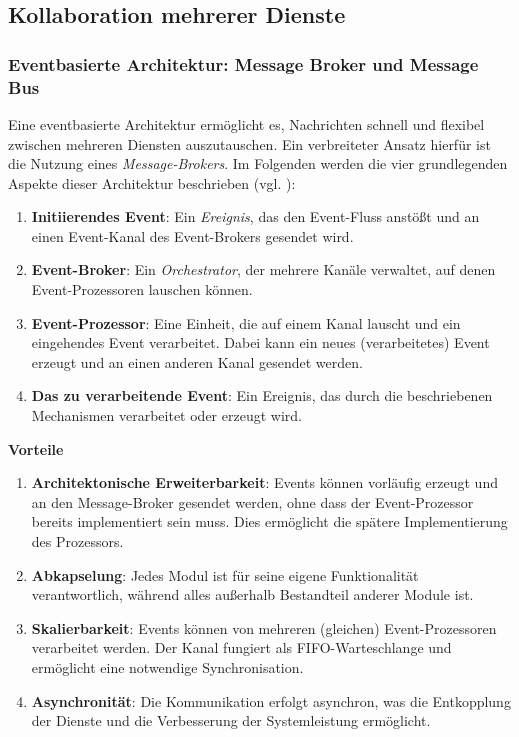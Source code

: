 \subsection{Kollaboration mehrerer Dienste}

\subsubsection{Eventbasierte Architektur: Message Broker und Message Bus} \label{cha:grundlagen:swdesign:kollab:msgbus}

Eine eventbasierte Architektur ermöglicht es, Nachrichten schnell und flexibel zwischen mehreren Diensten auszutauschen. Ein verbreiteter Ansatz hierfür ist die Nutzung eines \textit{Message-Brokers}. Im Folgenden werden die vier grundlegenden Aspekte dieser Architektur beschrieben (vgl. \autocite{oreilly:mod-swarch}):
\begin{enumerate}
    \item \textbf{Initiierendes Event}: Ein \textit{Ereignis}, das den Event-Fluss anstößt und an einen Event-Kanal des Event-Brokers gesendet wird.
    \item \textbf{Event-Broker}: Ein \textit{Orchestrator}, der mehrere Kanäle verwaltet, auf denen Event-Prozessoren lauschen können.
    \item \textbf{Event-Prozessor}: Eine Einheit, die auf einem Kanal lauscht und ein eingehendes Event verarbeitet. Dabei kann ein neues (verarbeitetes) Event erzeugt und an einen anderen Kanal gesendet werden.
    \item \textbf{Das zu verarbeitende Event}: Ein Ereignis, das durch die beschriebenen Mechanismen verarbeitet oder erzeugt wird.
\end{enumerate}

\textbf{Vorteile}

\begin{enumerate}
    \item \textbf{Architektonische Erweiterbarkeit}: Events können vorläufig erzeugt und an den Message-Broker gesendet werden, ohne dass der Event-Prozessor bereits implementiert sein muss. Dies ermöglicht die spätere Implementierung des Prozessors.
    \item \textbf{Abkapselung}: Jedes Modul ist für seine eigene Funktionalität verantwortlich, während alles außerhalb Bestandteil anderer Module ist.
    \item \textbf{Skalierbarkeit}: Events können von mehreren (gleichen) Event-Prozessoren verarbeitet werden. Der Kanal fungiert als FIFO-Warteschlange und ermöglicht eine notwendige Synchronisation.
    \item \textbf{Asynchronität}: Die Kommunikation erfolgt asynchron, was die Entkopplung der Dienste und die Verbesserung der Systemleistung ermöglicht.
\end{enumerate}

